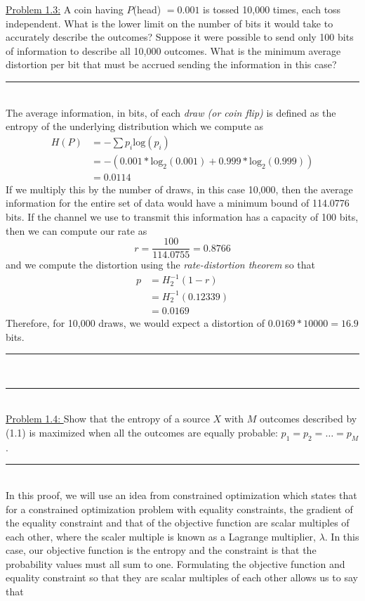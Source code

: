 \documentclass{article}
\newcommand{\problemsep}{\leavevmode\\[0.05in] \rule[\baselineskip/4]{\textwidth}{1pt} \\[0.005in] \rule[\baselineskip]{\textwidth}{1pt}\vspace{-\baselineskip}\leavevmode\\[0.05in]}
\newcommand{\statementsep}{\leavevmode\\[0.005in] \rule[\baselineskip/4]{\textwidth}{0.4pt}\leavevmode\\[0.005in]}
\begin{document}
\noindent\underline{Problem 1.3:} 
A coin having $P$(head) $= 0.001$ is tossed 10,000 times, each toss independent. What is the lower limit on the number of bits it would take to accurately describe the outcomes? Suppose it were possible to send only 100 bits of information to describe all 10,000 outcomes. What is the minimum average distortion per bit that must be accrued sending the information in this case?
\statementsep
The average information, in bits, of each {\it draw (or coin flip)} is defined as the entropy of the underlying distribution which we compute as
\begin{equation*}\begin{aligned}
	H(P) &= -\sum p_i\text{log}(p_i) \\ 
			 &= -(0.001*\text{log}_2(0.001) + 0.999*\text{log}_2(0.999)) \\
			 &= 0.0114
\end{aligned}\end{equation*}
If we multiply this by the number of draws, in this case 10,000, then the average information for the entire set of data would have a minimum bound of 114.0776 bits. If the channel we use to transmit this information has a capacity of 100 bits, then we can compute our rate as
\begin{equation*}
	r = \frac{100}{114.0755} = 0.8766
\end{equation*} 
and we compute the distortion using the {\it rate-distortion theorem} so that
\begin{equation*}\begin{aligned}
	p &= H_2^{-1}(1 - r) \\
    &= H_2^{-1}(0.12339)\\
		&= 0.0169
\end{aligned}\end{equation*}
Therefore, for 10,000 draws, we would expect a distortion of $0.0169*10000 = 16.9$ bits.
\problemsep
\noindent\underline{Problem 1.4: } 
Show that the entropy of a source $X$ with $M$ outcomes described by (1.1) is maximized when all the outcomes are equally probable: $p_1=p_2=\hdots=p_M$.
\statementsep
In this proof, we will use an idea from constrained optimization which states that for a constrained optimization problem with equality constraints, the gradient of the equality constraint and that of the objective function are scalar multiples of each other, where the scaler multiple is known as a Lagrange multiplier, $\lambda$. In this case, our objective function is the entropy and the constraint is that the probability values must all sum to one. Formulating the objective function and equality constraint so that they are scalar multiples of each other allows us to say that
\end{document}
